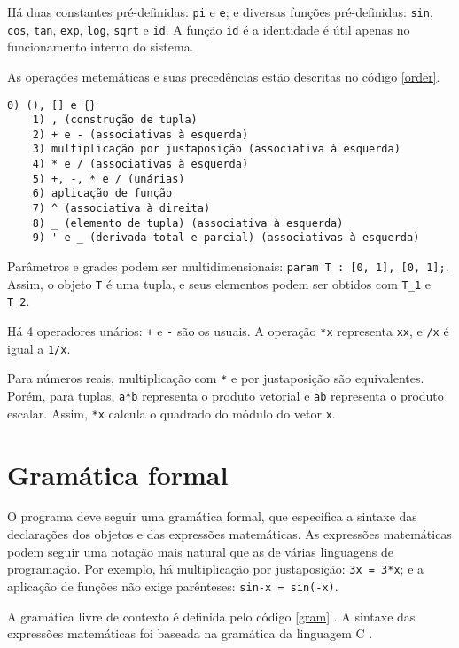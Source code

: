 Há duas constantes pré-definidas: \texttt{pi} e \texttt{e}; e diversas funções pré-definidas:
\texttt{sin}, \texttt{cos}, \texttt{tan},
\texttt{exp}, \texttt{log}, \texttt{sqrt} e \texttt{id}.
A função \texttt{id} é a identidade é útil apenas no funcionamento interno do sistema.

As operações metemáticas e suas precedências estão descritas no código \ref{order}.

\newpage
\begin{lstlisting}[caption=Ordem das operações,label=order]
    0) (), [] e {}
    1) , (construção de tupla)
    2) + e - (associativas à esquerda)
    3) multiplicação por justaposição (associativa à esquerda)
    4) * e / (associativas à esquerda)
    5) +, -, * e / (unárias)
    6) aplicação de função
    7) ^ (associativa à direita)
    8) _ (elemento de tupla) (associativa à esquerda)
    9) ' e _ (derivada total e parcial) (associativas à esquerda)
\end{lstlisting}

Parâmetros e grades podem ser multidimensionais:
\texttt{param T : [0, 1], [0, 1];}. Assim, o objeto \texttt{T} é uma tupla,
e seus elementos podem ser obtidos com \texttt{T\_1} e \texttt{T\_2}.

Há 4 operadores unários: \texttt{+} e \texttt{-} são os usuais.
A operação \texttt{*x} representa \texttt{xx}, e \texttt{/x} é igual a \texttt{1/x}.

Para números reais, multiplicação com \texttt{*} e por justaposição são equivalentes.
Porém, para tuplas, \texttt{a*b} representa o produto vetorial
e \texttt{ab} representa o produto escalar.
Assim, \texttt{*x} calcula o quadrado do módulo do vetor \texttt{x}.

\section{Gramática formal}

O programa deve seguir uma gramática formal, 
que especifica a sintaxe das declarações dos objetos e das expressões matemáticas.
As expressões matemáticas podem seguir uma notação mais natural
que as de várias linguagens de programação.
Por exemplo, há multiplicação por justaposição: \texttt{3x = 3*x};
e a aplicação de funções não exige parênteses: \texttt{sin-x = sin(-x)}.

A gramática livre de contexto é definida pelo código \ref{gram} \cite{Dragon:1}.
A sintaxe das expressões matemáticas foi baseada na gramática da linguagem C \cite{CGram}.

